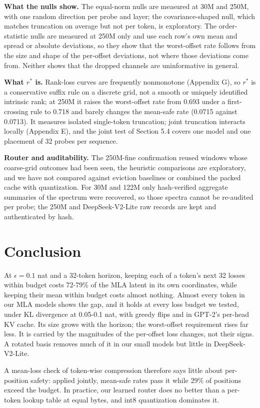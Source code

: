 \documentclass[11pt]{article}
\begin{document}
\textbf{What the nulls show.} The equal-norm nulls are measured at 30M and 250M, with one random direction per probe and layer; the covariance-shaped null, which matches truncation on average but not per token, is exploratory. The order-statistic nulls are measured at 250M only and use each row's own mean and spread or absolute deviations, so they show that the worst-offset rate follows from the size and shape of the per-offset deviations, not where those deviations come from. Neither shows that the dropped channels are uninformative in general.

\textbf{What $r^*$ is.} Rank-loss curves are frequently nonmonotone (Appendix G), so $r^*$ is a conservative suffix rule on a discrete grid, not a smooth or uniquely identified intrinsic rank; at 250M it raises the worst-offset rate from 0.693 under a first-crossing rule to 0.718 and barely changes the mean-safe rate (0.0715 against 0.0713). It measures isolated single-token truncation; joint truncation interacts locally (Appendix E), and the joint test of Section 5.4 covers one model and one placement of 32 probes per sequence.

\textbf{Router and auditability.} The 250M-fine confirmation reused windows whose coarse-grid outcomes had been seen, the heuristic comparisons are exploratory, and we have not compared against eviction baselines or combined the packed cache with quantization. For 30M and 122M only hash-verified aggregate summaries of the spectrum were recovered, so those spectra cannot be re-audited per probe; the 250M and DeepSeek-V2-Lite raw records are kept and authenticated by hash.

\section{Conclusion}

At $\epsilon=0.1$ nat and a 32-token horizon, keeping each of a token's next 32 losses within budget costs 72-79\% of the MLA latent in its own coordinates, while keeping their mean within budget costs almost nothing. Almost every token in our MLA models shows the gap, and it holds at every loss budget we tested, under KL divergence at 0.05-0.1 nat, with greedy flips and in GPT-2's per-head KV cache. Its size grows with the horizon; the worst-offset requirement rises far less. It is carried by the magnitudes of the per-offset loss changes, not their signs. A rotated basis removes much of it in our small models but little in DeepSeek-V2-Lite.

A mean-loss check of token-wise compression therefore says little about per-position safety: applied jointly, mean-safe rates pass it while 29\% of positions exceed the budget. In practice, our learned router does no better than a per-token lookup table at equal bytes, and int8 quantization dominates it.
\end{document}
